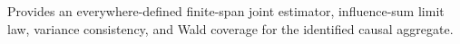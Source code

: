 Provides an everywhere-defined finite-span joint estimator, influence-sum limit law, variance consistency, and Wald coverage for the identified causal aggregate.